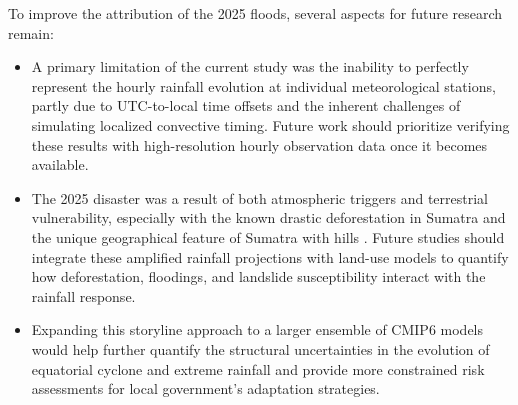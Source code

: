 To improve the attribution of the 2025 floods, several aspects for future research remain:
\begin{itemize}
    \item A primary limitation of the current study was the inability to perfectly represent the hourly rainfall evolution at individual meteorological stations, partly due to UTC-to-local time offsets and the inherent challenges of simulating localized convective timing. Future work should prioritize verifying these results with high-resolution hourly observation data once it becomes available.
    \item The 2025 disaster was a result of both atmospheric triggers and terrestrial vulnerability, especially with the known drastic deforestation in Sumatra and the unique geographical feature of Sumatra with hills \citep{wu2026analysis, wwa}. Future studies should integrate these amplified rainfall projections with land-use models to quantify how deforestation, floodings, and landslide susceptibility interact with the rainfall response.
    \item Expanding this storyline approach to a larger ensemble of CMIP6 models would help further quantify the structural uncertainties in the evolution of equatorial cyclone and extreme rainfall and provide more constrained risk assessments for local government’s adaptation strategies.
\end{itemize}